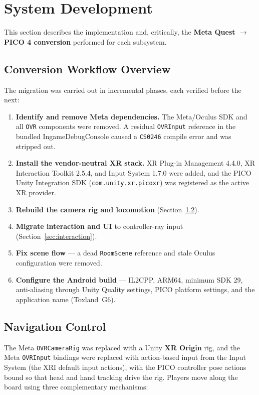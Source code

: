 \documentclass[a4paper,12pt]{article}
\begin{document}
\section{System Development}

This section describes the implementation and, critically, the \textbf{Meta Quest $\rightarrow$ PICO 4 conversion} performed for each subsystem.

\subsection{Conversion Workflow Overview}

The migration was carried out in incremental phases, each verified before the next:

\begin{enumerate}
  \item \textbf{Identify and remove Meta dependencies.} The Meta/Oculus SDK and all \texttt{OVR} components were removed. A residual \texttt{OVRInput} reference in the bundled IngameDebugConsole caused a \texttt{CS0246} compile error and was stripped out.
  \item \textbf{Install the vendor-neutral XR stack.} XR Plug-in Management 4.4.0, XR Interaction Toolkit 2.5.4, and Input System 1.7.0 were added, and the PICO Unity Integration SDK (\texttt{com.unity.xr.picoxr}) was registered as the active XR provider.
  \item \textbf{Rebuild the camera rig and locomotion} (Section~\ref{sec:nav}).
  \item \textbf{Migrate interaction and UI} to controller-ray input (Section~\ref{sec:interaction}).
  \item \textbf{Fix scene flow} --- a dead \texttt{RoomScene} reference and stale Oculus configuration were removed.
  \item \textbf{Configure the Android build} --- IL2CPP, ARM64, minimum SDK 29, anti-aliasing through Unity Quality settings, PICO platform settings, and the application name (Toxland~G6).
\end{enumerate}

\subsection{Navigation Control}
\label{sec:nav}

The Meta \texttt{OVRCameraRig} was replaced with a Unity \textbf{XR Origin} rig, and the Meta \texttt{OVRInput} bindings were replaced with action-based input from the Input System (the XRI default input actions), with the PICO controller pose actions bound so that head and hand tracking drive the rig. Players move along the board using three complementary mechanisms:
\end{document}
